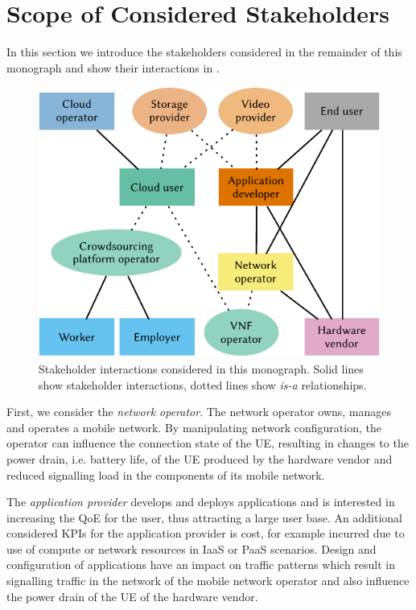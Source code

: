 \section{Scope of Considered Stakeholders}\label{sec:introduction:considered_stakeholders}

In this section we introduce the stakeholders considered in the remainder of this monograph and show their interactions in .

\begin{figure}
\centering
\includegraphics{figures/stakeholders}
\caption{Stakeholder interactions considered in this monograph. Solid lines show stakeholder interactions, dotted lines show \emph{is-a} relationships.}\label{fig:introduction:stakeholders}
\end{figure}

First, we consider the \emph{network operator}.
The network operator owns, manages and operates a mobile network.
By manipulating network configuration, the operator can influence the connection state of the \gls{UE}, resulting in changes to the power drain, i.e. battery life, of the \gls{UE} produced by the hardware vendor and reduced signalling load in the components of its mobile network.

The \emph{application provider} develops and deploys applications and is interested in increasing the \gls{QoE} for the user, thus attracting a large user base.
An additional considered \glspl{KPI} for the application provider is cost, for example incurred due to use of compute or network resources in \gls{IaaS} or \gls{PaaS} scenarios.
Design and configuration of applications have an impact on traffic patterns which result in signalling traffic in the network of the mobile network operator and also influence the power drain of the \gls{UE} of the hardware vendor.

